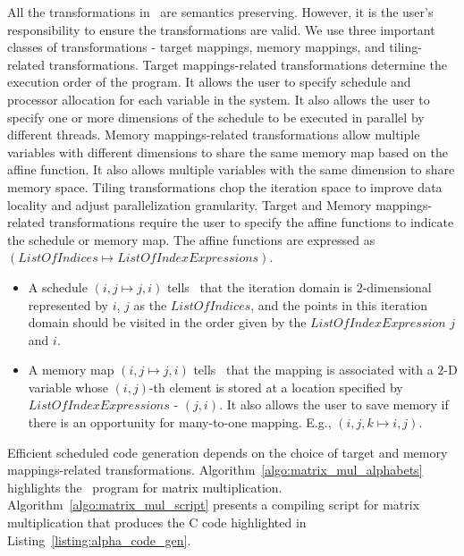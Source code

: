 All the transformations in \alphaz\ are semantics preserving. However, it is the user's responsibility to ensure the transformations are valid. We use three important classes of transformations - target mappings, memory mappings, and tiling-related transformations. Target mappings-related transformations determine the execution order of the program. It allows the user to specify schedule and processor allocation for each variable in the system. It also allows the user to specify one or more dimensions of the schedule to be executed in parallel by different threads.  Memory mappings-related transformations allow multiple variables with different dimensions to share the same memory map based on the affine function. It also allows multiple variables with the same dimension to share memory space. Tiling transformations chop the iteration space to improve data locality and adjust parallelization granularity. Target and Memory mappings-related transformations require the user to specify the affine functions to indicate the schedule or memory map. The affine functions are expressed as $(ListOfIndices \mapsto ListOfIndexExpressions)$.
\begin{itemize}
    \item A schedule $(i, j \mapsto j, i)$ tells \alphaz\ that the iteration domain is $2$-dimensional represented by $i$, $j$ as the $ListOfIndices$, and the points in this iteration domain should be visited in the order given by the $ListOfIndexExpression$   $j$ and $i$.
    \item A memory map $(i, j \mapsto j, i)$ tells \alphaz\ that the mapping is associated with a $2$-D variable whose $(i, j)$-th element is stored at a location specified by $ListOfIndexExpressions$ - $(j, i)$.  It also allows the user to save memory if there is an opportunity for many-to-one mapping. E.g., $(i, j, k \mapsto i, j)$.
\end{itemize}

Efficient scheduled code generation depends on the choice of target and memory mappings-related transformations. 
Algorithm~\ref{algo:matrix_mul_alphabets} highlights the \alfa\ program for matrix multiplication. Algorithm~\ref{algo:matrix_mul_script} presents a compiling script for matrix multiplication that produces the C code highlighted in Listing~\ref{listing:alpha_code_gen}.


